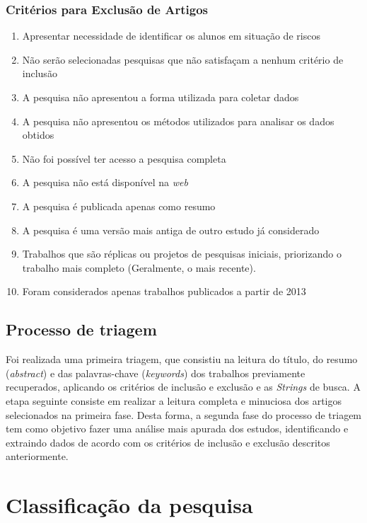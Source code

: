 \documentclass[
	12pt,				%
	openright,			%
	oneside,
	a4paper,			%
	english,			%
	french,				%
	spanish,			%
	brazil,				%
	]{abntex2}
\begin{document}
\subsubsection{Critérios para Exclusão de Artigos}
\begin{enumerate}
    \item Apresentar necessidade de identificar os alunos em situação de riscos
    \item Não serão selecionadas pesquisas que não satisfaçam a nenhum critério de inclusão
    \item A pesquisa não apresentou a forma utilizada para coletar dados
    \item A pesquisa não apresentou os métodos utilizados para analisar os dados obtidos
    \item Não foi possível ter acesso a pesquisa completa
    \item A pesquisa não está disponível na \textit{web}
    \item A pesquisa é publicada apenas como resumo
    \item A pesquisa é uma versão mais antiga de outro estudo já considerado
    \item Trabalhos que são réplicas ou projetos de pesquisas iniciais, priorizando o trabalho mais completo (Geralmente, o mais recente).
    \item Foram considerados apenas trabalhos publicados a partir de 2013
\end{enumerate}

\subsection{Processo de triagem}
Foi realizada uma primeira triagem, que consistiu na leitura do título, do resumo (\textit{abstract}) e das palavras-chave (\textit{keywords}) dos trabalhos previamente recuperados, aplicando os critérios de inclusão e exclusão e as \textit{Strings} de busca.
A etapa seguinte consiste em  realizar a leitura completa e minuciosa dos artigos selecionados na primeira fase. Desta forma, a segunda fase do processo de triagem tem como objetivo fazer uma análise mais apurada dos estudos, identificando e extraindo dados de acordo com os critérios de inclusão e exclusão descritos anteriormente.

\section{Classificação da pesquisa}
\end{document}
